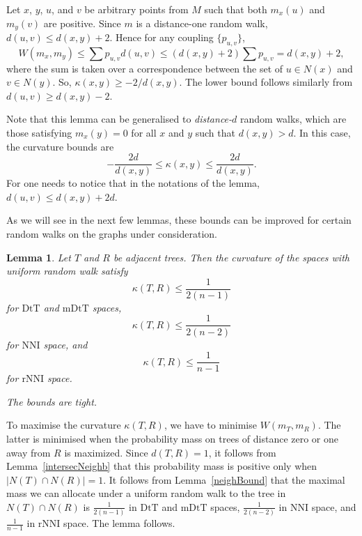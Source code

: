 \documentclass{amsart}
\newtheorem{lemma}{Lemma}
\newcommand{\dts}{\mathrm{DtT}}
\newcommand{\nni}{\mathrm{NNI}}
\newcommand{\rnni}{\mathrm{rNNI}}
\newcommand{\mdts}{\mathrm{mDtT}}
\begin{document}
\proof
Let $x$, $y$, $u$, and $v$ be arbitrary points from $M$ such that both $m_x(u)$
and $m_y(v)$ are positive. Since $m$ is a distance-one random walk,
$d(u,v) \leq d(x,y) + 2$. Hence for any coupling $\{p_{u,v}\}$,
\[
W(m_x,m_y) \leq \sum p_{u,v} d(u,v) \leq (d(x,y)+2)\sum p_{u,v} = d(x,y) + 2,
\]
where the sum is taken over a correspondence between the set of $u \in N(x)$ and
$v \in N(y)$. So, $\kappa(x,y) \geq - 2/d(x,y)$. The lower bound follows
similarly from $d(u,v) \geq d(x,y) - 2$.
\endproof

Note that this lemma can be generalised to {\em distance-$d$} random walks,
which are those satisfying $m_x(y) = 0$ for all $x$ and $y$ such that
$d(x,y) > d$. In this case, the curvature bounds are
\[
-\dfrac{2d}{d(x,y)} \leq \kappa(x,y) \leq \dfrac{2d}{d(x,y)}.
\]
For one needs to notice that in the notations of the lemma,
$d(u,v) \leq d(x,y) + 2d$.

As we will see in the next few lemmas, these bounds can be improved for certain random walks on the graphs under consideration.

\begin{lemma}\label{uniformUpper}
Let $T$ and $R$ be adjacent trees.
Then the curvature of the spaces with uniform random walk satisfy
\[
\kappa(T,R) \leq \dfrac{1}{2(n-1)}
\]
for $\dts$ and $\mdts$ spaces,
\[
\kappa(T,R) \leq \dfrac{1}{2(n-2)}
\]
for $\nni$ space, and
\[
\kappa(T,R) \leq \dfrac{1}{n-1}
\]
for $\rnni$ space.

The bounds are tight.
\end{lemma}

\proof
To maximise the curvature $\kappa(T,R)$, we have to minimise $W(m_T,m_R)$.
The latter is minimised when the probability mass on trees of distance zero or one away from $R$ is maximized.
Since $d(T,R) = 1$, it follows from Lemma~\ref{intersecNeighb} that this probability mass is positive only when $|N(T) \cap N(R)| = 1$. 
It follows from Lemma~\ref{neighBound} that the maximal mass we can allocate under a uniform random walk to the tree in $N(T) \cap N(R)$ is $\frac{1}{2(n-1)}$ in $\dts$ and $\mdts$ spaces, $\frac{1}{2(n-2)}$ in $\nni$ space, and $\frac{1}{n-1}$ in $\rnni$ space.
The lemma follows.
\endproof

\end{document}

